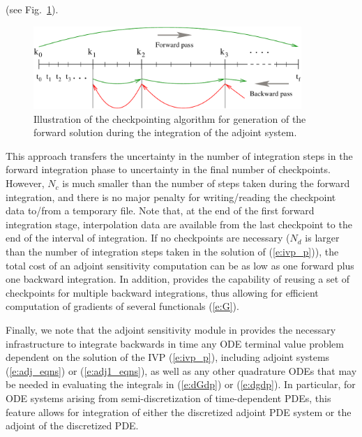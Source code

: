 (see Fig.~\ref{f:ckpnt}).
%
\begin{figure}
\centerline{\includegraphics[width=4in]{ckpnt}}
\caption {Illustration of the checkpointing algorithm for generation of 
  the forward solution during the integration of the adjoint system.}
\label{f:ckpnt}
\end{figure}

This approach transfers the uncertainty in the number of integration
steps in the forward integration phase to uncertainty in the final
number of checkpoints.  However, $N_c$ is much smaller than the number
of steps taken during the forward integration, and there is no major
penalty for writing/reading the checkpoint data to/from a temporary
file.
%
Note that, at the end of the first forward integration stage, interpolation
data are available from the last checkpoint to the end of the interval
of integration.  If no checkpoints are necessary ($N_d$ is larger than the 
number of integration steps taken in the solution of (\ref{e:ivp_p})),
the total cost of an adjoint sensitivity computation can be as low as one forward
plus one backward integration.
%
In addition, {\cvodes} provides the capability of reusing a set of checkpoints
for multiple backward integrations, thus allowing for efficient computation of
gradients of several functionals (\ref{e:G}).

\bigskip

Finally, we note that the adjoint sensitivity module in {\cvodes} provides the
necessary infrastructure to integrate backwards in time any ODE terminal value
problem dependent on the solution of the IVP (\ref{e:ivp_p}), including
adjoint systems (\ref{e:adj_eqns}) or (\ref{e:adj1_eqns}), as well as any other
quadrature ODEs that may be needed in evaluating the integrals in (\ref{e:dGdp}) 
or (\ref{e:dgdp}). In particular, for ODE systems arising from semi-discretization
of time-dependent PDEs, this feature allows for integration of either the 
discretized adjoint PDE system or the adjoint of the discretized PDE.

